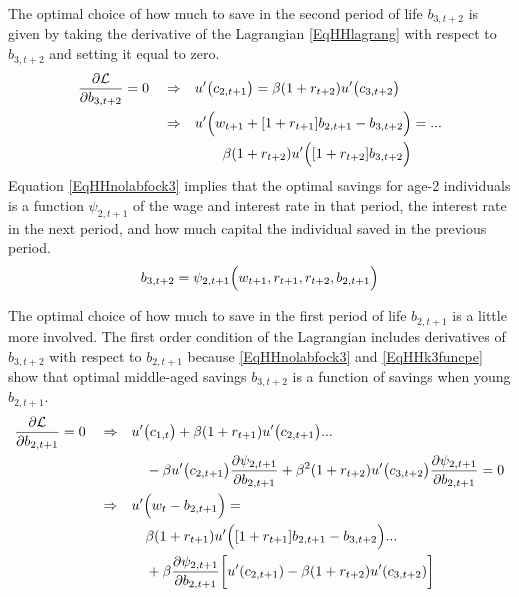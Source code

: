 \documentclass[letterpaper,12pt]{article}
\theoremstyle{definition}
\numberwithin{equation}{section}
\numberwithin{exercise}{section}
\begin{document}
\begin{spacing}{1.5}
      The optimal choice of how much to save in the second period of life $b_{3,t+2}$ is given by taking the derivative of the Lagrangian \eqref{EqHHlagrang} with respect to $b_{3,t+2}$ and setting it equal to zero.
      \begin{equation}\label{EqHHnolabfock3}
         \begin{split}
            \frac{\partial\mathcal{L}}{\partial b_{3,t+2}} = 0 \quad\Rightarrow\quad &u'\bigl(c_{2,t+1}\bigr) = \beta(1 + r_{t+2})u'\bigl(c_{3,t+2}\bigr) \\
            \Rightarrow\quad &u'\Bigl(w_{t+1} + [1 + r_{t+1}]b_{2,t+1} - b_{3,t+2}\Bigr) = ... \\
            &\quad\quad \beta(1 + r_{t+2})u'\Bigl([1 + r_{t+2}]b_{3,t+2}\Bigr)
         \end{split}
      \end{equation}
      Equation \eqref{EqHHnolabfock3} implies that the optimal savings for age-2 individuals is a function $\psi_{2,t+1}$ of the wage and interest rate in that period, the interest rate in the next period, and how much capital the individual saved in the previous period.
      \begin{equation}\label{EqHHk3funcpe}
         b_{3,t+2} = \psi_{2,t+1}\Bigl(w_{t+1},r_{t+1},r_{t+2},b_{2,t+1}\Bigr)
      \end{equation}

      The optimal choice of how much to save in the first period of life $b_{2,t+1}$ is a little more involved. The first order condition of the Lagrangian includes derivatives of $b_{3,t+2}$ with respect to $b_{2,t+1}$ because \eqref{EqHHnolabfock3} and \eqref{EqHHk3funcpe} show that optimal middle-aged savings $b_{3,t+2}$ is a function of savings when young $b_{2,t+1}$.
      \begin{equation}\label{EqHHfock2a}
         \begin{split}
            \frac{\partial\mathcal{L}}{\partial b_{2,t+1}} = 0 \quad\Rightarrow\quad &u'\bigl(c_{1,t}\bigr)  + \beta(1+r_{t+1})u'\bigl(c_{2,t+1}\bigr) ... \\
            &\quad - \beta u'\bigl(c_{2,t+1}\bigr)\frac{\partial\psi_{2,t+1}}{\partial b_{2,t+1}} + \beta^2(1+r_{t+2})u'\bigl(c_{3,t+2}\bigr)\frac{\partial\psi_{2,t+1}}{\partial b_{2,t+1}} = 0 \\
            \Rightarrow\quad &u'\Bigl(w_{t} - b_{2,t+1}\Bigr) = \\
            &\quad\beta(1 + r_{t+1})u'\Bigl([1 + r_{t+1}]b_{2,t+1} - b_{3,t+2}\Bigr) ... \\
            &\quad + \beta\frac{\partial \psi_{2,t+1}}{\partial b_{2,t+1}}\biggl[u'(c_{2,t+1}) - \beta(1+r_{t+2})u'(c_{3,t+2})\biggr]
         \end{split}
      \end{equation}


\end{spacing}
\end{document}
